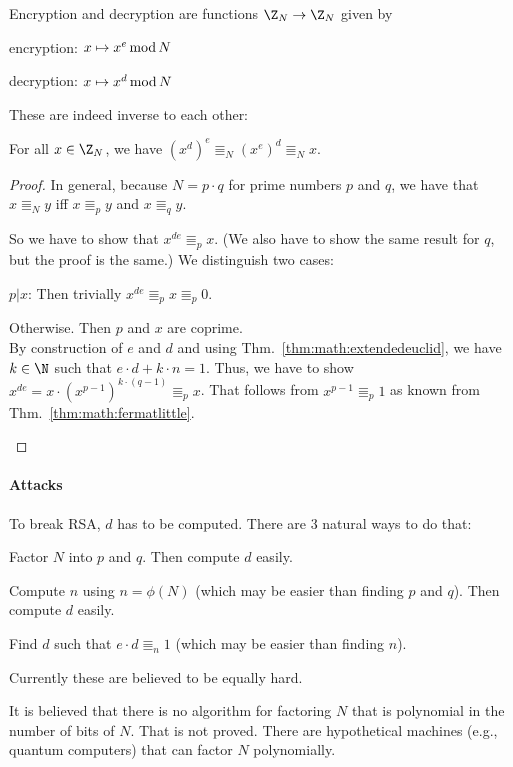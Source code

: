Encryption and decryption are functions $\Z_N\to \Z_N$ given by
\begin{compactitem}
 \item encryption: $x\mapsto x^e\mathop{\mathrm{mod}} N$
 \item decryption: $x\mapsto x^d\mathop{\mathrm{mod}} N$
\end{compactitem}

These are indeed inverse to each other:

\begin{theorem}
For all $x\in \Z_N$, we have $(x^d)^e\Equiv_N (x^e)^d \Equiv_N x$.
\end{theorem}
\begin{proof}
In general, because $N=p\cdot q$ for prime numbers $p$ and $q$, we have that $x\Equiv_N y$ iff $x\Equiv_p y$ and $x\Equiv_q y$.

So we have to show that $x^{de}\Equiv_p x$.
(We also have to show the same result for $q$, but the proof is the same.)
We distinguish two cases:
\begin{compactitem}
\item $p|x$: Then trivially $x^{de}\Equiv_p x\Equiv_p 0$.
\item Otherwise. Then $p$ and $x$ are coprime.\\
   By construction of $e$ and $d$ and using Thm.~\ref{thm:math:extendedeuclid}, we have $k\in\N$ such that $e\cdot d+k\cdot n=1$.
   Thus, we have to show $x^{de}=x\cdot (x^{p-1})^{k\cdot(q-1)}\Equiv_p x$.
   That follows from $x^{p-1}\Equiv_p 1$ as known from Thm.~\ref{thm:math:fermatlittle}.
\end{compactitem}
\end{proof}

\paragraph{Attacks}
To break RSA, $d$ has to be computed.
There are $3$ natural ways to do that:
\begin{compactitem}
 \item Factor $N$ into $p$ and $q$. Then compute $d$ easily.
 \item Compute $n$ using $n=\phi(N)$ (which may be easier than finding $p$ and $q$). Then compute $d$ easily.
 \item Find $d$ such that $e\cdot d\Equiv_n 1$ (which may be easier than finding $n$).
\end{compactitem}
Currently these are believed to be equally hard.

It is believed that there is no algorithm for factoring $N$ that is polynomial in the number of bits of $N$.
That is not proved.
There are hypothetical machines (e.g., quantum computers) that can factor $N$ polynomially.

